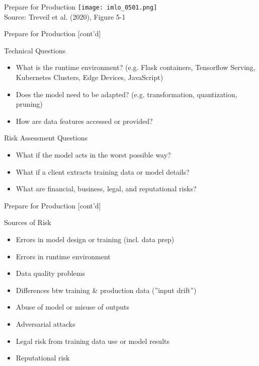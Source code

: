 \documentclass[ignorenonframetext,xcolor=x11names]{beamer}
\begin{document}
\begin{frame}{Prepare for Production}
\centering
\texttt{[image: imlo\_0501.png]} \\

\vspace{\baselineskip}
\scriptsize Source: Treveil et al. (2020), Figure 5-1
\end{frame}

\begin{frame}{Prepare for Production \small [cont'd]}
\begin{block}{Technical Questions}
\begin{itemize}
   \item What is the runtime environment? (e.g. Flask containers, Tensorflow Serving, Kubernetes Clusters, Edge Devices, JavaScript)
   \item Does the model need to be adapted? (e.g. transformation, quantization, pruning)
   \item How are data features accessed or provided?
\end{itemize}
\end{block}
\begin{block}{Risk Assessment Questions}
\begin{itemize}
    \item What if the model acts in the worst possible way?
    \item What if a client extracts training data or model details?
    \item What are financial, business, legal, and reputational risks?
\end{itemize}
\end{block}
\end{frame}

\begin{frame}{Prepare for Production \small [cont'd]}
\begin{block}{Sources of Risk}
\begin{itemize}
   \item Errors in model design or training (incl. data prep)
   \item Errors in runtime environment
   \item Data quality problems
   \item Differences btw training \& production data (''input drift'')
   \item Abuse of model or misuse of outputs
   \item Adversarial attacks
   \item Legal risk from training data use or model results
   \item Reputational risk
\end{itemize}
\end{block}
\end{frame}
\end{document}
